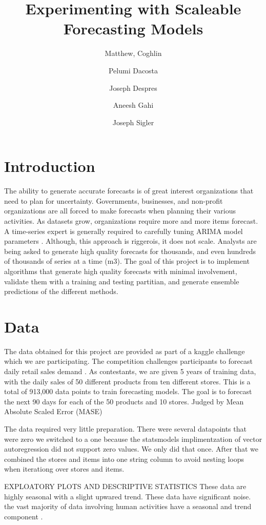 \documentclass[12pt,twocolumn,letterpaper]{article}
\title{Experimenting with Scaleable Forecasting Models}
\author{
    Matthew, Coghlin\\
  	\and
  	Pelumi Dacosta\\
    \and
    Joseph Despres\\
    \and
    Aneesh Gahi\\
    \and
    Joseph Sigler\\
}
\begin{document}
\maketitle


\section{Introduction}


The ability to generate accurate forecasts is of great interest organizations that need to plan for uncertainty. Governments, businesses, and non-profit organizations are all forced to make forecasts when planning their various activities. As datasets grow, organizations require more and more items forecast. A time-series expert is generally required to carefully tuning ARIMA model parameters \cite{taylor2018forecasting}. Although, this approach is riggerois, it does not scale. Analysts are being asked to generate high quality forecasts for thousands, and even hundreds of thousands of series at a time (m3). The goal of this project is to implement algorithms that generate high quality forecasts with minimal involvement, validate them with a training and testing partitian, and generate ensemble predictions of the different methods.

\section{Data}

The data obtained for this project are provided as part of a kaggle challenge which we are participating. The competition challenges participants to forecast daily retail sales demand \cite{kaggle}. As contestants, we are given 5 years of training data, with the daily sales of 50 different products from ten different stores. This is a total of 913,000 data points to train forecasting models. The goal is to forecast the next 90 days for each of the 50 products and 10 stores. Judged by Mean Absolute Scaled Error (MASE)

The data required very little preparation. There were several datapoints that were zero we switched to a one because the statsmodels implimentzation of vector autoregression did not support zero values. We only did that once. After that we combined the stores and items into one string column to avoid nesting loops when iterationg over stores and items.

EXPLOATORY PLOTS AND DESCRIPTIVE STATISTICS
These data are highly seasonal with a slight upwared trend. These data have significant noise. the vast majority of data involving human activities have a seasonal and trend component \cite{taylor2018forecasting}. 
\end{document}
